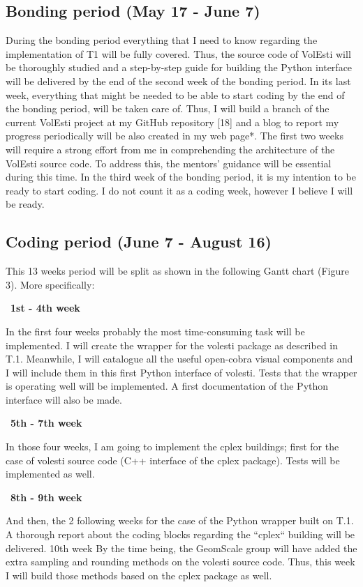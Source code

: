 \documentclass{article}
\begin{document}
\subsection{Bonding period (May 17 - June 7)}
During the bonding period everything that I need to know regarding the implementation of T1 will be fully covered. 
Thus, the source code of VolEsti will be thoroughly studied and a step-by-step guide for building the Python interface will be delivered by the end of the second week of the bonding period. 
In its last week, everything that might be needed to be able to start coding by the end of the bonding period, will be taken care of.
Thus, I will build a branch of the current VolEsti project at my GitHub repository [18] and a blog to report my progress periodically will be also created in my web page*. 
The first two weeks will require a strong effort from me in comprehending the architecture of the VolEsti source code. 
To address this, the mentors’ guidance will be essential during this time. 
In the third week of the bonding period, it is my intention to be ready to start coding. I do not count it as a coding week, however I believe I will be ready.



\subsection{Coding period (June 7 - August 16)}
This 13 weeks period will be split as shown in the following Gantt chart (Figure 3).  More specifically:


\textbullet\ \textbf{1st - 4th week }

In the first four weeks probably the most time-consuming task will be implemented. 
I will create the wrapper for the volesti package as described in T.1. 
Meanwhile, I will catalogue all the useful open-cobra visual components and I will include them in this first Python interface of volesti. 
Tests that the wrapper is operating well will be implemented. 
A first documentation of the Python interface will also be made.

\textbullet\ \textbf{5th - 7th week}

In those four weeks, I am going to implement the cplex buildings; first for the case of volesti source code (C++ interface of the cplex package). 
Tests will be implemented as well. 

\textbullet\ \textbf{8th - 9th week}

And then, the 2 following weeks for the case of the Python wrapper built on T.1. 
A thorough report about the coding blocks regarding the “cplex“ building will be delivered.
10th week
By the time being, the GeomScale group will have added the extra sampling and rounding methods on the volesti source code. 
Thus, this week I will build those methods based on the cplex package as well.
\end{document}
